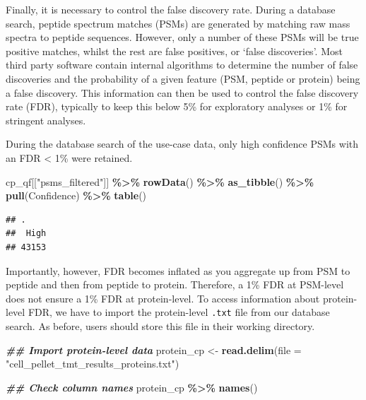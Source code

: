 \documentclass[9pt,a4paper,]{extarticle}
\newenvironment{Shaded}{\begin{snugshade}}{\end{snugshade}}
\newcommand{\AttributeTok}[1]{\textcolor[rgb]{0.13,0.29,0.53}{#1}}
\newcommand{\DocumentationTok}[1]{\textcolor[rgb]{0.56,0.35,0.01}{\textbf{\textit{#1}}}}
\newcommand{\FunctionTok}[1]{\textcolor[rgb]{0.13,0.29,0.53}{\textbf{#1}}}
\newcommand{\NormalTok}[1]{#1}
\newcommand{\OtherTok}[1]{\textcolor[rgb]{0.56,0.35,0.01}{#1}}
\newcommand{\SpecialCharTok}[1]{\textcolor[rgb]{0.81,0.36,0.00}{\textbf{#1}}}
\newcommand{\StringTok}[1]{\textcolor[rgb]{0.31,0.60,0.02}{#1}}
\begin{document}
Finally, it is necessary to control the false discovery rate. During a database
search, peptide spectrum matches (PSMs) are generated by matching raw mass spectra
to peptide sequences. However, only a number of these PSMs will be true positive
matches, whilst the rest are false positives, or `false discoveries'. Most third
party software contain internal algorithms to determine the number of false
discoveries and the probability of a given feature (PSM, peptide or protein)
being a false discovery. This information can then be used to control the false
discovery rate (FDR), typically to keep this below 5\% for exploratory analyses or
1\% for stringent analyses.

During the database search of the use-case data, only high confidence PSMs with
an FDR \textless{} 1\% were retained.

\begin{Shaded}
\begin{Highlighting}[]
\NormalTok{cp\_qf[[}\StringTok{"psms\_filtered"}\NormalTok{]] }\SpecialCharTok{\%\textgreater{}\%}
  \FunctionTok{rowData}\NormalTok{() }\SpecialCharTok{\%\textgreater{}\%}
  \FunctionTok{as\_tibble}\NormalTok{() }\SpecialCharTok{\%\textgreater{}\%}
  \FunctionTok{pull}\NormalTok{(Confidence) }\SpecialCharTok{\%\textgreater{}\%}
  \FunctionTok{table}\NormalTok{()}
\end{Highlighting}
\end{Shaded}

\begin{verbatim}
## .
##  High 
## 43153
\end{verbatim}

Importantly, however, FDR becomes inflated as you aggregate up from PSM to
peptide and then from peptide to protein. Therefore, a 1\% FDR at PSM-level does
not ensure a 1\% FDR at protein-level. To access information about protein-level
FDR, we have to import the protein-level \texttt{.txt} file from our database search.
As before, users should store this file in their working directory.

\begin{Shaded}
\begin{Highlighting}[]
\DocumentationTok{\#\# Import protein{-}level data}
\NormalTok{protein\_cp }\OtherTok{\textless{}{-}} \FunctionTok{read.delim}\NormalTok{(}\AttributeTok{file =} \StringTok{"cell\_pellet\_tmt\_results\_proteins.txt"}\NormalTok{)}

\DocumentationTok{\#\# Check column names}
\NormalTok{protein\_cp }\SpecialCharTok{\%\textgreater{}\%}
  \FunctionTok{names}\NormalTok{()}
\end{Highlighting}
\end{Shaded}
\end{document}
